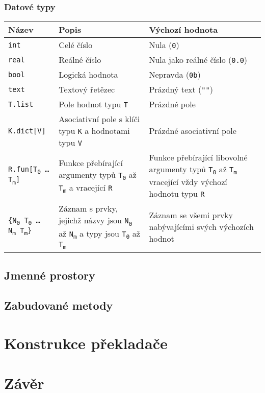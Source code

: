 \documentclass[a4paper,12pt]{article}
\def\quote #1{"#1"}
\begin{document}
\subsubsection{Datové typy}
\begin{tabular}{|m{3.5cm} m{6cm} m{5cm}|}\hline
Název & Popis & Výchozí hodnota \\\hline
\texttt{int} & Celé číslo & Nula (\texttt{0})\\\hline
\texttt{real} & Reálné číslo & Nula jako reálné číslo (\texttt{0.0})\\\hline
\texttt{bool} & Logická hodnota & Nepravda (\texttt{0b})\\\hline
\texttt{text} & Textový řetězec & Prázdný text (\texttt{\quote{}})\\\hline
\texttt{T.list} & Pole hodnot typu \texttt{T} & Prázdné pole\\\hline
\texttt{K.dict[V]} & Asociativní pole s klíči typu \texttt{K} a hodnotami typu \texttt{V} & Prázdné asociativní pole\\\hline
\texttt{R.fun[T\textsubscript{0} \ldots{} T\textsubscript{m}]} & Funkce přebírající argumenty typů \texttt{T\textsubscript{0}} až \texttt{T\textsubscript{m}} a vracející \texttt{R} & Funkce přebírající libovolné argumenty typů \texttt{T\textsubscript{0}} až \texttt{T\textsubscript{m}} vracející vždy výchozí hodnotu typu \texttt{R}\\\hline
\texttt{\{N\textsubscript{0} T\textsubscript{0} \ldots{} N\textsubscript{m} T\textsubscript{m}\}} & Záznam s prvky, jejichž názvy jsou \texttt{N\textsubscript{0}} až \texttt{N\textsubscript{m}} a typy jsou \texttt{T\textsubscript{0}} až \texttt{T\textsubscript{m}} & Záznam se všemi prvky nabývajícími svých výchozích hodnot\\\hline
\end{tabular}

\subsection{Jmenné prostory}

\subsection{Zabudované metody}

\section{Konstrukce překladače}

\section{Závěr}

\newpage
\printbibliography[heading=bibintoc, title={Použitá literatura}]
\newpage
\end{document}
